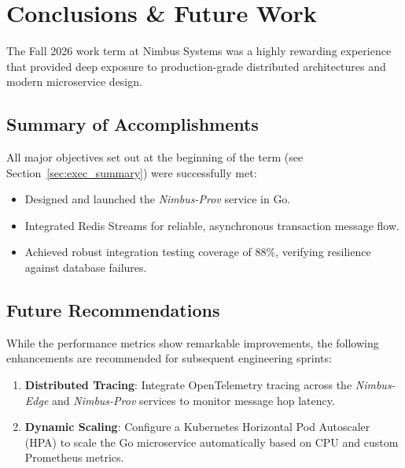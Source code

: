 \section{Conclusions \& Future Work}
\label{sec:conclusions}

The Fall 2026 work term at Nimbus Systems was a highly rewarding experience that provided deep exposure to production-grade distributed architectures and modern microservice design.

\subsection{Summary of Accomplishments}
All major objectives set out at the beginning of the term (see Section~\ref{sec:exec_summary}) were successfully met:
\begin{itemize}
  \item Designed and launched the \emph{Nimbus-Prov} service in Go.
  \item Integrated Redis Streams for reliable, asynchronous transaction message flow.
  \item Achieved robust integration testing coverage of 88\%, verifying resilience against database failures.
\end{itemize}

\subsection{Future Recommendations}
While the performance metrics show remarkable improvements, the following enhancements are recommended for subsequent engineering sprints:
\begin{enumerate}
  \item \textbf{Distributed Tracing}: Integrate OpenTelemetry tracing across the \emph{Nimbus-Edge} and \emph{Nimbus-Prov} services to monitor message hop latency.
  \item \textbf{Dynamic Scaling}: Configure a Kubernetes Horizontal Pod Autoscaler (HPA) to scale the Go microservice automatically based on CPU and custom Prometheus metrics.
\end{enumerate}
